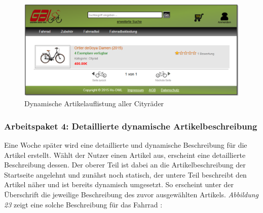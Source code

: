 \begin{figure}[H]
\begin{center}
\includegraphics[width=150mm]{Bilder/Abbildung10-DynamischeArtikelauflistungAllerCitybikes.png}
\end{center}
\caption{Dynamische Artikelauflistung aller Cityräder}
\label{Abbildung10-Dynamische Artikelauflistung aller Cityräder}
\end{figure}


\subsubsection{Arbeitspaket 4: Detaillierte dynamische Artikelbeschreibung}

Eine Woche später wird eine detaillierte und dynamische Beschreibung für die Artikel erstellt. Wählt der Nutzer einen Artikel aus, erscheint eine detaillierte Beschreibung dessen. Der oberer Teil ist dabei an die Artikelbeschreibung der Startseite angelehnt und zunähst noch statisch, der untere Teil beschreibt den Artikel näher und ist bereits dynamisch umgesetzt. So erscheint unter der Überschrift \grqq{} die jeweilige Beschreibung des zuvor ausgewählten Artikels. \textit{Abbildung 23} zeigt eine solche Beschreibung für das Fahrrad \grqq{}:

